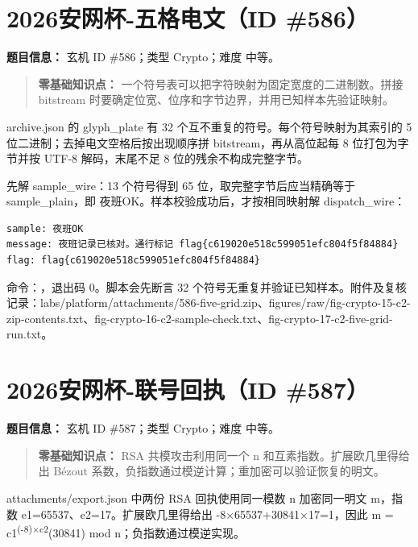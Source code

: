 \section{2026安网杯-五格电文（ID \#586）}\label{ux5b89ux7f51ux676f-ux4e94ux683cux7535ux6587id-586}

\textbf{题目信息：} 玄机 ID \#586；类型 Crypto；难度 中等。

\begin{quote}
\textbf{零基础知识点：} 一个符号表可以把字符映射为固定宽度的二进制数。拼接 bitstream 时要确定位宽、位序和字节边界，并用已知样本先验证映射。
\end{quote}

archive.json 的 glyph\_plate 有 32 个互不重复的符号。每个符号映射为其索引的 5 位二进制；去掉电文空格后按出现顺序拼 bitstream，再从高位起每 8 位打包为字节并按 UTF-8 解码，末尾不足 8 位的残余不构成完整字节。

先解 sample\_wire：13 个符号得到 65 位，取完整字节后应当精确等于 sample\_plain，即 夜班OK。样本校验成功后，才按相同映射解 dispatch\_wire：

\begin{verbatim}
sample: 夜班OK
message: 夜班记录已核对。通行标记 flag{c619020e518c599051efc804f5f84884}
flag: flag{c619020e518c599051efc804f5f84884}
\end{verbatim}

命令：\texttt{}，退出码 0。脚本会先断言 32 个符号无重复并验证已知样本。附件及复核记录：labs/platform/attachments/586-five-grid.zip、figures/raw/fig-crypto-15-c2-zip-contents.txt、fig-crypto-16-c2-sample-check.txt、fig-crypto-17-c2-five-grid-run.txt。

\section{2026安网杯-联号回执（ID \#587）}\label{ux5b89ux7f51ux676f-ux8054ux53f7ux56deux6267id-587}

\textbf{题目信息：} 玄机 ID \#587；类型 Crypto；难度 中等。

\begin{quote}
\textbf{零基础知识点：} RSA 共模攻击利用同一个 n 和互素指数。扩展欧几里得给出 Bézout 系数，负指数通过模逆计算；重加密可以验证恢复的明文。
\end{quote}

attachments/export.json 中两份 RSA 回执使用同一模数 n 加密同一明文 m，指数 e1=65537、e2=17。扩展欧几里得给出 -8×65537+30841×17=1，因此 m = c1\textsuperscript{(-8)×c2}(30841) mod n；负指数通过模逆实现。

